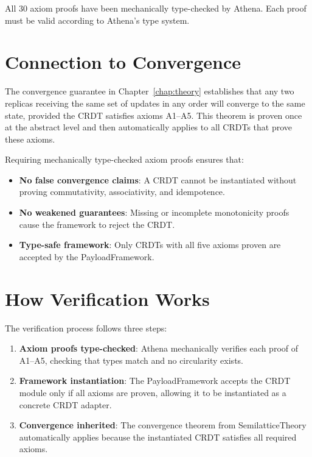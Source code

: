 All 30 axiom proofs have been mechanically type-checked by Athena. Each proof must be valid according to Athena's type system.

\section{Connection to Convergence}

The convergence guarantee in Chapter~\ref{chap:theory} establishes that any two replicas receiving the same set of updates in any order will converge to the same state, provided the CRDT satisfies axioms A1--A5. This theorem is proven once at the abstract level and then automatically applies to all CRDTs that prove these axioms.

Requiring mechanically type-checked axiom proofs ensures that:

\begin{itemize}
  \item \textbf{No false convergence claims}: A CRDT cannot be instantiated without proving commutativity, associativity, and idempotence.
  
  \item \textbf{No weakened guarantees}: Missing or incomplete monotonicity proofs cause the framework to reject the CRDT.
  
  \item \textbf{Type-safe framework}: Only CRDTs with all five axioms proven are accepted by the PayloadFramework.
\end{itemize}

\section{How Verification Works}

The verification process follows three steps:

\begin{enumerate}
  \item \textbf{Axiom proofs type-checked}: Athena mechanically verifies each proof of A1--A5, checking that types match and no circularity exists.
  
  \item \textbf{Framework instantiation}: The PayloadFramework accepts the CRDT module only if all axioms are proven, allowing it to be instantiated as a concrete CRDT adapter.
  
  \item \textbf{Convergence inherited}: The convergence theorem from SemilatticeTheory automatically applies because the instantiated CRDT satisfies all required axioms.
\end{enumerate}

